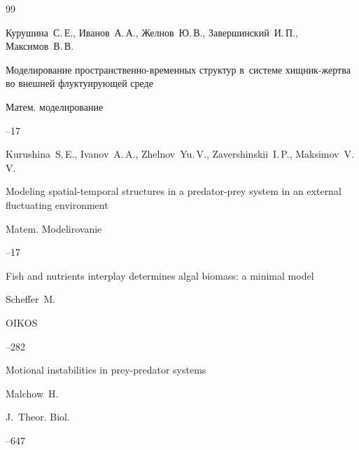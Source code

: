 \begin{thebibliography}{99}

\by Курушина~С.\,Е., Иванов~А.\,А., Желнов~Ю.\,В., Завершинский~И.\,П., Максимов~В.\,В.

\paper Моделирование пространственно-временных структур в~системе хищник-жертва во внешней флуктуирующей среде

\jour Матем. моделирование




--17



\misctransl

\by Kurushina~S.\,E., Ivanov~A.\,A., Zhelnov~Yu.\,V., Zavershinskii~I.\,P., Maksimov~V.\,V. 

\paper Modeling spatial-temporal structures in a predator-prey system in an external fluctuating environment

\jour Matem. Modelirovanie




–17






\paper Fish and nutrients interplay determines algal biomass: a minimal model

\by Scheffer~M.

\jour  OIKOS




--282






\paper Motional instabilities in prey-predator systems

\by Malchow~H.

\jour  J.~Theor. Biol.




--647




\end{thebibliography}

